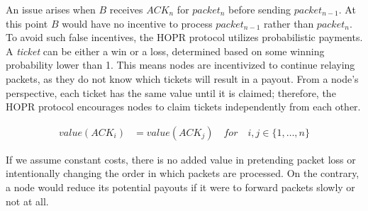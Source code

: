 An issue arises when $B$ receives $ACK_n$ for $packet_n$ before sending $packet_{n-1}$. At this point $B$ would have no incentive to process $packet_{n-1}$ rather than $packet_{n}$. To avoid such false incentives, the HOPR protocol utilizes probabilistic payments. A \textit{ticket} can be either a win or a loss, determined based on some winning probability lower than 1. This means nodes are incentivized to continue relaying packets, as they do not know which tickets will result in a payout. From a node's perspective, each ticket has the same value until it is claimed; therefore, the HOPR protocol encourages nodes to claim tickets independently from each other.

\begin{align}
    value ( ACK_i ) & =value ( ACK_j ) \quad for \quad i,j\in \{1,\dots,n\}
\end{align}

If we assume constant costs, there is no added value in pretending packet loss or intentionally changing the order in which packets are processed. On the contrary, a node would reduce its potential payouts if it were to forward packets slowly or not at all.